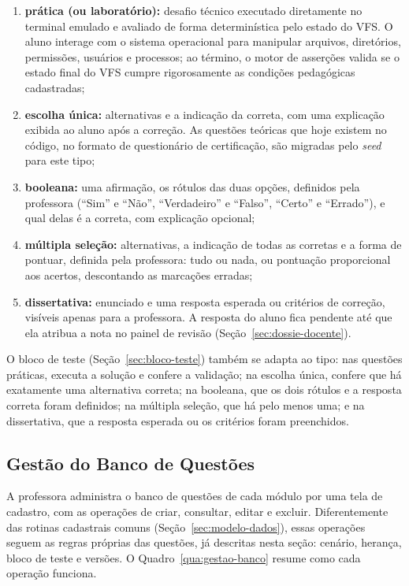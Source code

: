 \begin{enumerate}
    \item \textbf{prática (ou laboratório):} desafio técnico executado diretamente no terminal emulado e avaliado de forma determinística pelo estado do VFS. O aluno interage com o sistema operacional para manipular arquivos, diretórios, permissões, usuários e processos; ao término, o motor de asserções valida se o estado final do VFS cumpre rigorosamente as condições pedagógicas cadastradas;
    \item \textbf{escolha única:} alternativas e a indicação da correta, com uma explicação exibida ao aluno após a correção. As questões teóricas que hoje existem no código, no formato de questionário de certificação, são migradas pelo \textit{seed} para este tipo;
    \item \textbf{booleana:} uma afirmação, os rótulos das duas opções, definidos pela professora (``Sim'' e ``Não'', ``Verdadeiro'' e ``Falso'', ``Certo'' e ``Errado''), e qual delas é a correta, com explicação opcional;
    \item \textbf{múltipla seleção:} alternativas, a indicação de todas as corretas e a forma de pontuar, definida pela professora: tudo ou nada, ou pontuação proporcional aos acertos, descontando as marcações erradas;
    \item \textbf{dissertativa:} enunciado e uma resposta esperada ou critérios de correção, visíveis apenas para a professora. A resposta do aluno fica pendente até que ela atribua a nota no painel de revisão (Seção~\ref{sec:dossie-docente}).
\end{enumerate}

O bloco de teste (Seção~\ref{sec:bloco-teste}) também se adapta ao tipo: nas questões práticas, executa a solução e confere a validação; na escolha única, confere que há exatamente uma alternativa correta; na booleana, que os dois rótulos e a resposta correta foram definidos; na múltipla seleção, que há pelo menos uma; e na dissertativa, que a resposta esperada ou os critérios foram preenchidos.

\subsection{Gestão do Banco de Questões}
\label{sec:gestao-banco}

A professora administra o banco de questões de cada módulo por uma tela de cadastro, com as operações de criar, consultar, editar e excluir. Diferentemente das rotinas cadastrais comuns (Seção~\ref{sec:modelo-dados}), essas operações seguem as regras próprias das questões, já descritas nesta seção: cenário, herança, bloco de teste e versões. O Quadro~\ref{qua:gestao-banco} resume como cada operação funciona.

